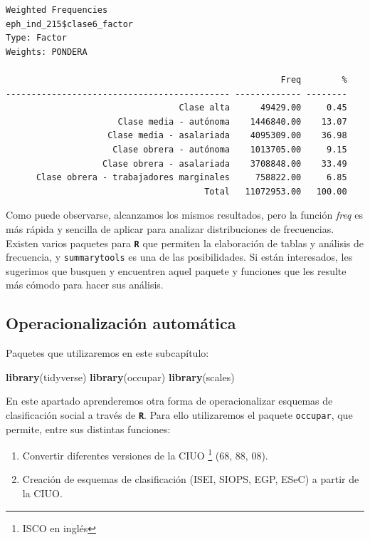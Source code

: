 \documentclass[
]{article}
\newenvironment{Shaded}{\begin{snugshade}}{\end{snugshade}}
\newcommand{\FunctionTok}[1]{\textcolor[rgb]{0.13,0.29,0.53}{\textbf{#1}}}
\newcommand{\NormalTok}[1]{#1}
\begin{document}
\begin{verbatim}
Weighted Frequencies  
eph_ind_215$clase6_factor  
Type: Factor  
Weights: PONDERA  

                                                      Freq        %
-------------------------------------------- ------------- --------
                                  Clase alta      49429.00     0.45
                      Clase media - autónoma    1446840.00    13.07
                    Clase media - asalariada    4095309.00    36.98
                     Clase obrera - autónoma    1013705.00     9.15
                   Clase obrera - asalariada    3708848.00    33.49
      Clase obrera - trabajadores marginales     758822.00     6.85
                                       Total   11072953.00   100.00
\end{verbatim}

Como puede observarse, alcanzamos los mismos resultados, pero la función \emph{freq} es más rápida y sencilla de aplicar para analizar distribuciones de frecuencias. Existen varios paquetes para \textbf{\texttt{R}} que permiten la elaboración de tablas y análisis de frecuencia, y \texttt{summarytools} es una de las posibilidades. Si están interesados, les sugerimos que busquen y encuentren aquel paquete y funciones que les resulte más cómodo para hacer sus análisis.

\hypertarget{operacion2}{%
\subsection{Operacionalización automática}\label{operacion2}}

Paquetes que utilizaremos en este subcapítulo:

\begin{Shaded}
\begin{Highlighting}[]
\FunctionTok{library}\NormalTok{(tidyverse)}
\FunctionTok{library}\NormalTok{(occupar)}
\FunctionTok{library}\NormalTok{(scales)}
\end{Highlighting}
\end{Shaded}

En este apartado aprenderemos otra forma de operacionalizar esquemas de clasificación social a través de \textbf{\texttt{R}}. Para ello utilizaremos el paquete \texttt{occupar}, que permite, entre sus distintas funciones:

\begin{enumerate}
\def\labelenumi{\arabic{enumi}.}
\item
  Convertir diferentes versiones de la CIUO \footnote{ISCO en inglés} (68, 88, 08).
\item
  Creación de esquemas de clasificación (ISEI, SIOPS, EGP, ESeC) a partir de la CIUO.
\end{enumerate}
\end{document}

